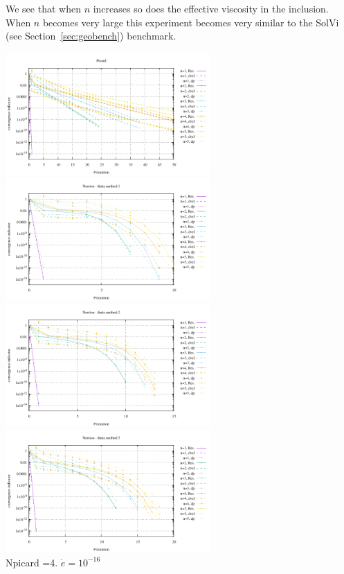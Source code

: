 We see that when $n$ increases so does the effective viscosity in the inclusion. When 
$n$ becomes very large this experiment becomes very similar to the SolVi (see 
Section~\ref{sec:geobench}) benchmark.

\begin{center}
\includegraphics[width=7.8cm]{python_codes/fieldstone_87/results/experiment_05/conv_picard.pdf}
\includegraphics[width=7.8cm]{python_codes/fieldstone_87/results/experiment_05/conv_meth1.pdf}\\
\includegraphics[width=7.8cm]{python_codes/fieldstone_87/results/experiment_05/conv_meth2.pdf}
\includegraphics[width=7.8cm]{python_codes/fieldstone_87/results/experiment_05/conv_meth3.pdf}\\
{\captionfont Npicard =4. $\dot{e}=10^{-16}$}
\end{center}


